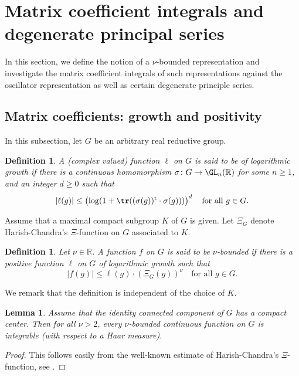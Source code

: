 \documentclass[12pt,a4paper]{amsart}
\def\abs#1{\left|{#1}\right|}
\newcommand{\R}{\mathbb R}
\numberwithin{equation}{section}
\newtheorem{lem}[thm]{Lemma}
\newtheorem{dfnl}[thm]{Definition}
\theoremstyle{remark}
\begin{document}
\section{Matrix coefficient integrals and degenerate principal series}\label{sec:Integrals}

In this section, we define the notion of a $\nu$-bounded representation and investigate the
matrix coefficient integrals of such representations against the oscillator representation as well as certain
degenerate principle series.

\subsection{Matrix coefficients: growth and positivity}

In this subsection, let $G$ be an arbitrary  real reductive group.
\begin{dfnl}
  A (complex valued) function $\ell$ on $G$ is said to be of \emph{logarithmic
    growth} if there is a continuous homomorphism
  $\sigma\colon G\rightarrow \GL_n(\R)$ for some $n\geq 1$, and an integer
  $d\geq 0$ such that
  \[
    \abs{\ell(g)}\leq \left(\log(1+\tr((\sigma(g))^\mathrm{t} \cdot
      \sigma(g)))\right)^d\quad \textrm{for all }g\in G.
  \]

\end{dfnl}

Assume that a maximal compact subgroup $K$ of $G$ is given. Let $\Xi_{G}$ denote Harish-Chandra's $\Xi$-function on $G$ associated to $K$.
\begin{dfnl}
  Let $\nu\in \R$. A function $f$ on $G$ is said to be \emph{$\nu$-bounded} if
  there is a positive function $\ell$ on $G$ of logarithmic growth such that
  \[
    \abs{f(g)}\leq \ell(g) \cdot (\Xi_G (g))^\nu\quad \textrm{for all }g\in G.
  \]
\end{dfnl}

We remark that the definition is independent of the choice of $K$.


\begin{lem}\label{intgrability}
  Assume that the identity connected component of $G$ has a compact center. Then
  for all $\nu>2$, every $\nu$-bounded continuous function on $G$ is integrable
  (with respect to a Haar measure).
\end{lem}

\begin{proof}
  This follows easily from the well-known estimate of Harish-Chandra's
  $\Xi$-function, see \cite[Theorem 4.5.3]{Wa1}.
\end{proof}
\end{document}

